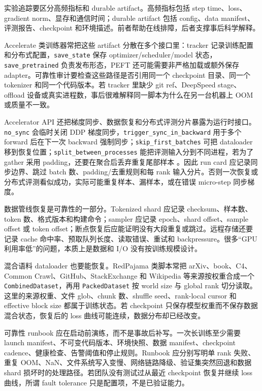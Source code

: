 \documentclass[UTF8,zihao=-4,openany]{ctexbook}
\begin{document}
实验追踪要区分高频指标和 durable artifact。高频指标包括 step time、loss、gradient norm、显存和通信时间；durable artifact 包括 config、data manifest、评测报告、checkpoint 和环境描述。前者帮助在线排障，后者支撑事后科学解释。

Accelerate 类训练器常把这些 artifact 分散在多个接口里：tracker 记录训练配置和分布式配置，\texttt{save\_state} 保存 optimizer/scheduler/model 状态，\texttt{save\_pretrained} 负责发布形态，PEFT 还可能需要非严格加载或额外保存 adapter。可靠性审计要检查这些路径是否引用同一个 checkpoint 目录、同一个 tokenizer 和同一个代码版本。若 tracker 里缺少 git ref、DeepSpeed stage、offload 设备或真实进程数，事后很难解释同一脚本为什么在另一台机器上 OOM 或质量不一致。

Accelerator API 还把梯度同步、数据恢复和分布式评测分片暴露为运行时接口。\texttt{no\_sync} 会临时关闭 DDP 梯度同步，\texttt{trigger\_sync\_in\_backward} 用于多个 forward 后在下一次 backward 强制同步；\texttt{skip\_first\_batches} 可把 dataloader 移到恢复位置；\texttt{split\_between\_processes} 能把评测输入分到不同进程，若为了 gather 采用 padding，还要在聚合后丢弃重复尾部样本 \cite{huggingface2026accelerator}。因此 run card 应记录同步边界、跳过 batch 数、padding/去重规则和每 rank 输入分片。否则一次恢复或分布式评测看似成功，实际可能重复样本、漏样本，或在错误 micro-step 同步梯度。

数据管线恢复是可靠性的一部分。Tokenized shard 应记录 checksum、样本数、token 数、格式版本和构建命令；sampler 应记录 epoch、shard offset、sample offset 或 token offset；断点恢复后应能证明没有大段重复或跳过。远程存储还要记录 cache 命中率、预取队列长度、读取错误、重试和 backpressure。很多“GPU 利用率低”的问题，本质上是数据和 I/O 没有按训练规模设计。

混合语料 dataloader 也要能恢复。RedPajama 类脚本常把 arXiv、book、C4、Common Crawl、GitHub、StackExchange 和 Wikipedia 等来源按权重合成一个 \texttt{CombinedDataset}，再用 \texttt{PackedDataset} 按 world size 与 global rank 切分读取。这里的来源权重、文件 glob、chunk 数、shuffle seed、rank-local cursor 和 effective block size 都属于训练状态。若 checkpoint 只保存模型权重而不保存数据混合状态，恢复后的 loss 曲线可能连续，数据分布却已经改变。

可靠性 runbook 应在启动前演练，而不是事故后补写。一次长训练至少需要 launch manifest、不可变代码版本、环境快照、数据 manifest、checkpoint cadence、健康检查、告警阈值和停止规则。Runbook 应分别写明单 rank 失败、重复 OOM、NaN、文件系统写入变慢、网络链路降级、验证集突然回退和数据 shard 损坏时的处理路径。若团队没有测试过从最近 checkpoint 恢复并继续 loss 曲线，所谓 fault tolerance 只是配置项，不是已验证能力。
\end{document}
